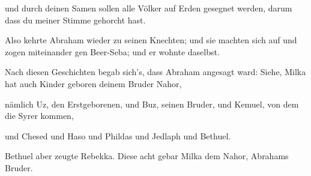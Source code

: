  und durch deinen Samen sollen alle Völker auf Erden
gesegnet werden, darum dass du meiner Stimme gehorcht hast.

 Also kehrte Abraham wieder zu seinen Knechten; und sie
machten sich auf und zogen miteinander gen Beer-Seba; und er wohnte
daselbst.

 Nach diesen Geschichten begab sich's, dass Abraham
angesagt ward: Siehe, Milka hat auch Kinder geboren deinem Bruder Nahor,

 nämlich Uz, den Erstgeborenen, und Buz, seinen Bruder, und
Kemuel, von dem die Syrer kommen,

 und Chesed und Haso und Phildas und Jedlaph und Bethuel.

 Bethuel aber zeugte Rebekka. Diese acht gebar Milka dem
Nahor, Abrahams Bruder.

